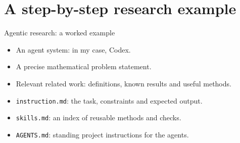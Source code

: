 \documentclass[11pt,aspectratio=169]{beamer}
\begin{document}
\section{A step-by-step research example}

\begin{frame}[t]{Agentic research: a worked example}
  \vspace{3mm}
  \begin{itemize}
    \setlength{\itemsep}{2.5mm}
    \item An agent system: in my case, Codex.
    \item A precise mathematical problem statement.
    \item Relevant related work: definitions, known results and useful methods.
    \item \texttt{instruction.md}: the task, constraints and expected output.
    \item \texttt{skills.md}: an index of reusable methods and checks.
    \item \texttt{AGENTS.md}: standing project instructions for the agents.
  \end{itemize}

\end{frame}
\end{document}
